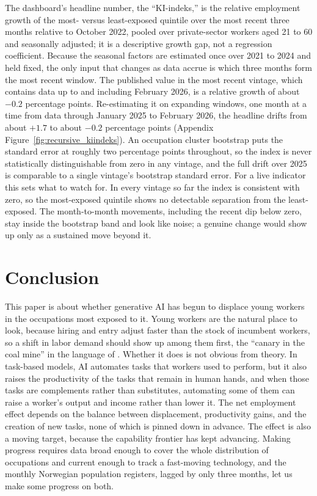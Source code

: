\documentclass[12pt]{article}
\begin{document}
The dashboard's headline number, the ``KI-indeks,'' is the relative employment growth of the most- versus least-exposed quintile over the most recent three months relative to October 2022, pooled over private-sector workers aged 21 to 60 and seasonally adjusted; it is a descriptive growth gap, not a regression coefficient. Because the seasonal factors are estimated once over 2021 to 2024 and held fixed, the only input that changes as data accrue is which three months form the most recent window. The published value in the most recent vintage, which contains data up to and including February 2026, is a relative growth of about $-0.2$ percentage points. Re-estimating it on expanding windows, one month at a time from data through January 2025 to February 2026, the headline drifts from about $+1.7$ to about $-0.2$ percentage points (Appendix Figure~\ref{fig:recursive_kiindeks}). An occupation cluster bootstrap puts the standard error at roughly two percentage points throughout, so the index is never statistically distinguishable from zero in any vintage, and the full drift over 2025 is comparable to a single vintage's bootstrap standard error. For a live indicator this sets what to watch for. In every vintage so far the index is consistent with zero, so the most-exposed quintile shows no detectable separation from the least-exposed. The month-to-month movements, including the recent dip below zero, stay inside the bootstrap band and look like noise; a genuine change would show up only as a sustained move beyond it.

\section{Conclusion}\label{sec:conclusion}

This paper is about whether generative AI has begun to displace young workers in the occupations most exposed to it. Young workers are the natural place to look, because hiring and entry adjust faster than the stock of incumbent workers, so a shift in labor demand should show up among them first, the ``canary in the coal mine'' in the language of \citet{brynjolfsson2025}. Whether it does is not obvious from theory. In task-based models, AI automates tasks that workers used to perform, but it also raises the productivity of the tasks that remain in human hands, and when those tasks are complements rather than substitutes, automating some of them can raise a worker's output and income rather than lower it. The net employment effect depends on the balance between displacement, productivity gains, and the creation of new tasks, none of which is pinned down in advance. The effect is also a moving target, because the capability frontier has kept advancing. Making progress requires data broad enough to cover the whole distribution of occupations and current enough to track a fast-moving technology, and the monthly Norwegian population registers, lagged by only three months, let us make some progress on both.
\end{document}
